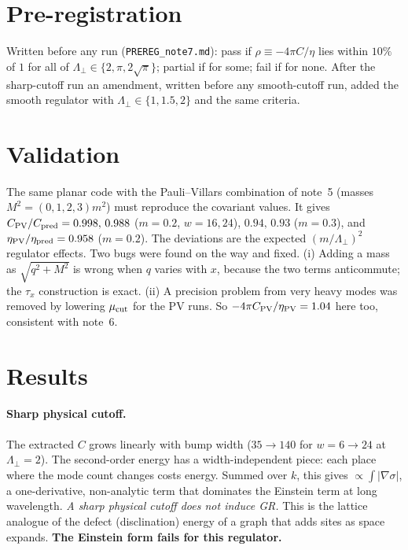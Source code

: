 \documentclass[11pt]{article}
\begin{document}
\section{Pre-registration}
Written before any run (\texttt{PREREG\_note7.md}): pass if $\rho\equiv-4\pi C/\eta$ lies within $10\%$ of $1$ for all of $\Lambda_\perp\in\{2,\pi,2\sqrt\pi\}$; partial if for some; fail if for none. After the sharp-cutoff run an amendment, written before any smooth-cutoff run, added the smooth regulator with $\Lambda_\perp\in\{1,1.5,2\}$ and the same criteria.

\section{Validation}
The same planar code with the Pauli--Villars combination of note~5 (masses $M^2=(0,1,2,3)m^2$) must reproduce the covariant values. It gives $C_{\rm PV}/C_{\rm pred}=0.998,\,0.988$ ($m=0.2$, $w=16,24$), $0.94,\,0.93$ ($m=0.3$), and $\eta_{\rm PV}/\eta_{\rm pred}=0.958$ ($m=0.2$). The deviations are the expected $(m/\Lambda_\perp)^2$ regulator effects. Two bugs were found on the way and fixed. (i) Adding a mass as $\sqrt{q^2+M^2}$ is wrong when $q$ varies with $x$, because the two terms anticommute; the $\tau_x$ construction is exact. (ii) A precision problem from very heavy modes was removed by lowering $\mu_{\rm cut}$ for the PV runs. So $-4\pi C_{\rm PV}/\eta_{\rm PV}=1.04$ here too, consistent with note~6.

\section{Results}
\paragraph{Sharp physical cutoff.} The extracted $C$ grows linearly with bump width ($35\to140$ for $w=6\to24$ at $\Lambda_\perp=2$). The second-order energy has a width-independent piece: each place where the mode count changes costs energy. Summed over $k$, this gives $\propto\int|\nabla\sigma|$, a one-derivative, non-analytic term that dominates the Einstein term at long wavelength. \emph{A sharp physical cutoff does not induce GR.} This is the lattice analogue of the defect (disclination) energy of a graph that adds sites as space expands. \textbf{The Einstein form fails for this regulator.}
\end{document}
